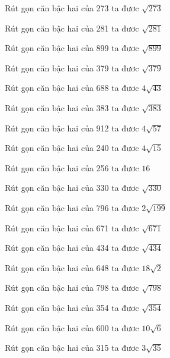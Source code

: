\documentclass[12pt,a4paper]{article}
\begin{document}
\begin{ex}
Rút gọn căn bậc hai của 273 ta đươc $\sqrt{273}$
\end{ex}
\begin{ex}
Rút gọn căn bậc hai của 281 ta đươc $\sqrt{281}$
\end{ex}
\begin{ex}
Rút gọn căn bậc hai của 899 ta đươc $\sqrt{899}$
\end{ex}
\begin{ex}
Rút gọn căn bậc hai của 379 ta đươc $\sqrt{379}$
\end{ex}
\begin{ex}
Rút gọn căn bậc hai của 688 ta đươc $4\sqrt{43}$
\end{ex}
\begin{ex}
Rút gọn căn bậc hai của 383 ta đươc $\sqrt{383}$
\end{ex}
\begin{ex}
Rút gọn căn bậc hai của 912 ta đươc $4\sqrt{57}$
\end{ex}
\begin{ex}
Rút gọn căn bậc hai của 240 ta đươc $4\sqrt{15}$
\end{ex}
\begin{ex}
Rút gọn căn bậc hai của 256 ta đươc $16$
\end{ex}
\begin{ex}
Rút gọn căn bậc hai của 330 ta đươc $\sqrt{330}$
\end{ex}
\begin{ex}
Rút gọn căn bậc hai của 796 ta đươc $2\sqrt{199}$
\end{ex}
\begin{ex}
Rút gọn căn bậc hai của 671 ta đươc $\sqrt{671}$
\end{ex}
\begin{ex}
Rút gọn căn bậc hai của 434 ta đươc $\sqrt{434}$
\end{ex}
\begin{ex}
Rút gọn căn bậc hai của 648 ta đươc $18\sqrt{2}$
\end{ex}
\begin{ex}
Rút gọn căn bậc hai của 798 ta đươc $\sqrt{798}$
\end{ex}
\begin{ex}
Rút gọn căn bậc hai của 354 ta đươc $\sqrt{354}$
\end{ex}
\begin{ex}
Rút gọn căn bậc hai của 600 ta đươc $10\sqrt{6}$
\end{ex}
\begin{ex}
Rút gọn căn bậc hai của 315 ta đươc $3\sqrt{35}$
\end{ex}
\end{document}

